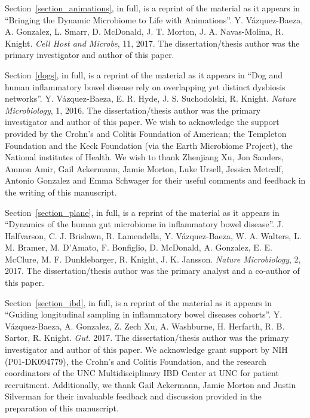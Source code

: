 \begin{frontmatter}
\begin{acknowledgements}
    Section~\ref{section_animations}, in full, is a reprint of the material as 
    it appears in ``Bringing the Dynamic Microbiome to Life with Animations''.  
    Y.  V\'azquez-Baeza, A. Gonzalez, L. Smarr, D.  McDonald, J.  T. Morton, J.  
    A.  Navas-Molina, R. Knight. \emph{Cell Host and Microbe}, 11, 2017. The 
    dissertation/thesis author was the primary investigator and author of this 
    paper.

    Section~\ref{dogs}, in full, is a reprint of the material as it appears in 
    ``Dog and human inflammatory bowel disease rely on overlapping yet distinct 
    dysbiosis networks''. Y. V\'azquez-Baeza, E. R. Hyde, J. S.  Suchodolski, 
    R. Knight.  \emph{Nature Microbiology}, 1, 2016. The dissertation/thesis 
    author was the primary investigator and author of this paper. We wish to 
    acknowledge the support provided by the Crohn's and Colitis Foundation of 
    American; the Templeton Foundation and the Keck Foundation (via the Earth 
    Microbiome Project), the National institutes of Health. We wish to thank 
    Zhenjiang Xu, Jon Sanders, Amnon Amir, Gail Ackermann, Jamie Morton, Luke 
    Ursell, Jessica Metcalf, Antonio Gonzalez and Emma Schwager for their 
    useful comments and feedback in the writing of this manuscript. 

    Section~\ref{section_plane}, in full, is a reprint of the material as it 
    appears in ``Dynamics of the human gut microbiome in inflammatory bowel 
    disease''.  J. Halfvarson, C. J. Brislawn, R. Lamendella, Y.  
    V\'azquez-Baeza, W. A. Walters, L. M. Bramer, M. D'Amato, F.  Bonfiglio, D.  
    McDonald, A. Gonzalez, E. E. McClure, M. F. Dunklebarger, R. Knight, J.  K.  
    Jansson. \emph{Nature Microbiology}, 2, 2017. The dissertation/thesis 
    author was the primary analyst and a co-author of this paper.

    Section~\ref{section_ibd}, in full, is a reprint of the material as it 
    appears in ``Guiding longitudinal sampling in inflammatory bowel diseases 
    cohorts''. Y. V\'azquez-Baeza, A. Gonzalez, Z. Zech Xu, A. Washburne, H.  
    Herfarth, R.  B.  Sartor, R. Knight. \emph{Gut}. 2017. The 
    dissertation/thesis author was the primary investigator and author of this 
    paper. We acknowledge grant support by NIH (P01-DK094779), the Crohn's and 
    Colitis Foundation, and the research coordinators of the UNC 
    Multidisciplinary IBD Center at UNC for patient recruitment. Additionally, 
    we thank Gail Ackermann, Jamie Morton and Justin Silverman for their 
    invaluable feedback and discussion provided in the preparation of this 
    manuscript.


\end{acknowledgements}
\end{frontmatter}
